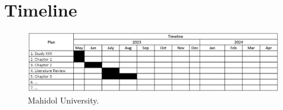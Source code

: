 \documentclass[a4paper]{report} %
\begin{document}
	\section{Timeline}
	\begin{figure}[!h]
		\noindent\Centering
		\includegraphics[width=1\textwidth]{Timeline}
		\caption{Mahidol University.}
		\label{fig:MU Logo}
	\end{figure}
\end{document}
